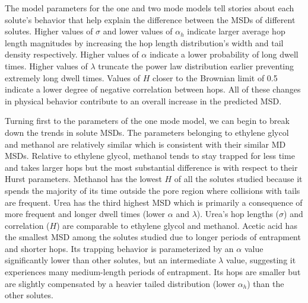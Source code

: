 \documentclass[aps,pre,preprint,groupedaddress,longbibliography]{revtex4-2}
\begin{document}
  The model parameters for the one and two mode models tell stories about each solute's
  behavior that help explain the difference between the MSDs of different solutes. 
  Higher values of $\sigma$ and lower values of $\alpha_h$ indicate larger average 
  hop length magnitudes by increasing the hop length distribution's width and tail 
  density respectively. Higher values of $\alpha$ indicate a lower probability of 
  long dwell times. Higher values of $\lambda$ truncate the power law distribution 
  earlier preventing extremely long dwell times. Values of $H$ closer to the Brownian
  limit of 0.5 indicate a lower degree of negative correlation between hops. All 
  of these changes in physical behavior contribute to an overall increase in the 
  predicted MSD.

  Turning first to the parameters of the one mode model, we can begin to break down the
  trends in solute MSDs. The parameters belonging to ethylene glycol and methanol are
  relatively similar which is consistent with their similar MD MSDs. Relative to 
  ethylene glycol, methanol tends to stay trapped for less time and takes larger hops
  but the most substantial difference is with respect to their Hurst parameters.  
  Methanol has the lowest $H$ of all the solutes studied because it spends the majority
  of its time outside the pore region where collisions with tails are frequent.
  Urea has the third highest MSD which is primarily a consequence of more frequent and
  longer dwell times (lower $\alpha$ and $\lambda$). Urea's hop lengths ($\sigma$) and
  correlation ($H$) are comparable to ethylene glycol and methanol. Acetic acid has the
  smallest MSD among the solutes studied due to longer periods of entrapment and shorter
  hops. Its trapping behavior is parameterized by an $\alpha$ value significantly lower
  than other solutes, but an intermediate $\lambda$ value, suggesting it experiences 
  many medium-length periods of entrapment. Its hops are smaller but are slightly 
  compensated by a heavier tailed distribution (lower $\alpha_h$) than the other solutes. 
  
\end{document}

